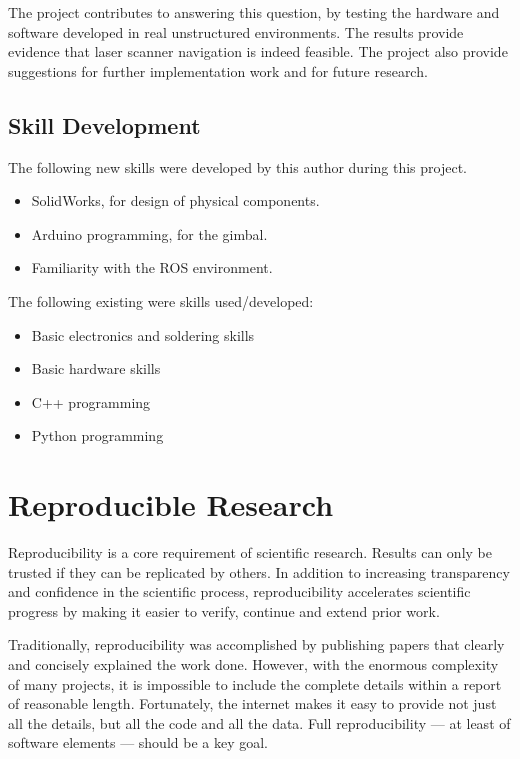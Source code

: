 \documentclass[12pt,oneside,a4paper]{book}
\begin{document}
The project contributes to answering this question, by testing the
hardware and software developed in real unstructured environments. The
results provide evidence that laser scanner navigation is indeed
feasible. The project also provide suggestions for further
implementation work and for future research.

\subsection{Skill Development}
\label{sec:skill-development}

The following new skills were developed by this author during this project.

\begin{itemize}
\item SolidWorks, for design of physical components.
\item Arduino programming, for the gimbal.
\item Familiarity with the \gls{ROS} environment.
 \end{itemize}
 \newpage
The following existing were skills used/developed:
\begin{itemize}
\item Basic electronics and soldering skills
\item Basic hardware skills
\item C++ programming
\item Python programming
\end{itemize}

\section{Reproducible Research}
\label{sec:repr-rese}

Reproducibility is a core requirement of scientific research. Results
can only be trusted if they can be replicated by others. In addition
to increasing transparency and confidence in the scientific process,
reproducibility accelerates scientific progress by making it easier to
verify, continue and extend prior work.

Traditionally, reproducibility was accomplished by publishing papers
that clearly and concisely explained the work done. However, with the
enormous complexity of many projects, it is impossible to include the
complete details within a report of reasonable length. Fortunately,
the internet makes it easy to provide not just all the details, but
all the code and all the data. Full reproducibility --- at least of
software elements --- should be a key goal.
\end{document}
